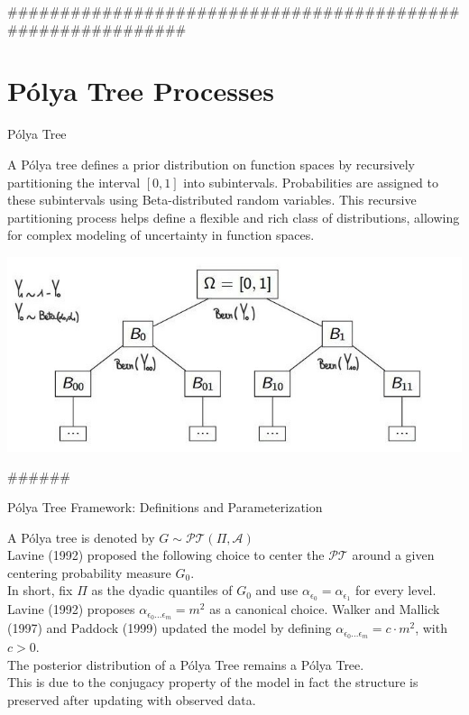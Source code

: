 \documentclass{beamer}
\begin{document}
############################################################

\section{Pólya Tree Processes}
\begin{frame}{Pólya Tree}


A Pólya tree defines a prior distribution on function spaces by recursively partitioning the interval $[0, 1]$ into subintervals. Probabilities are assigned to these subintervals using Beta-distributed random variables. This recursive partitioning process helps define a flexible and rich class of distributions, allowing for complex modeling of uncertainty in function spaces.
\bigskip %

\begin{center}
    \includegraphics[width=\textwidth]{albero.jpg}
    
\end{center}

\end{frame}

######
\begin{frame}{Pólya Tree Framework: Definitions and Parameterization}

    A Pólya tree is denoted by \textbf{\(G \sim \mathcal{PT}(\Pi, \mathcal{A})\)}\\
    \bigskip
    Lavine (1992) proposed the following choice
    to center the \(\mathcal{PT}\) around a given centering probability measure \(G_0\). \\ 
    In short, fix \(\Pi\) as
     the dyadic quantiles of \(G_0\) and use \(\alpha_{\epsilon_0}=\alpha_{\epsilon_1}\) for every level.\\
     \bigskip
     Lavine (1992) proposes \(\alpha_{\epsilon_0 ... \epsilon_m} = m^2\) as a canonical choice. Walker and Mallick (1997) and Paddock (1999) updated the model by defining  \(\alpha_{\epsilon_0 ... \epsilon_m} = c \cdot m^2\), with \(c > 0\). \\
     \bigskip
     The posterior distribution of a Pólya Tree remains a Pólya Tree. \\
    This is due to the conjugacy property of the model in fact the structure is preserved after updating with observed data.

     
\end{frame}
\end{document}
